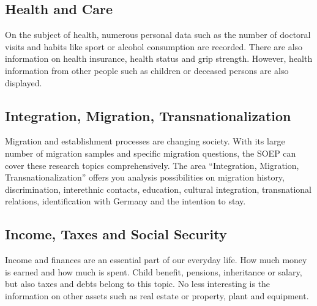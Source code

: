 \documentclass[letterpaper,10pt,openany,onesideH,english]{sphinxmanual}
\begin{document}
\begin{figure}[H]
\centering
{}\end{figure}


\subsection{Health and Care}
\label{\detokenize{Contents of SOEPcore/index:health-and-care}}
On the subject of health, numerous personal data such as the number of doctoral visits and habits like sport or alcohol consumption are recorded. There are also information on health insurance, health status and grip strength. However, health information from other people such as children or deceased persons are also displayed.

\begin{figure}[H]
\centering
{}\end{figure}


\subsection{Integration, Migration, Transnationalization}
\label{\detokenize{Contents of SOEPcore/index:integration-migration-transnationalization}}
Migration and establishment processes are changing society. With its large number of migration samples and specific migration questions, the SOEP can cover these research topics comprehensively. The area “Integration, Migration, Transnationalization” offers you analysis possibilities on migration history, discrimination, interethnic contacts, education, cultural integration, transnational relations, identification with Germany and the intention to stay.

\subsection{Income, Taxes and Social Security}
\label{\detokenize{Contents of SOEPcore/index:income-taxes-and-social-security}}
Income and finances are an essential part of our everyday life. How much money is earned and how much is spent. Child benefit, pensions, inheritance or salary, but also taxes and debts belong to this topic. No less interesting is the information on other assets such as real estate or property, plant and equipment.
\end{document}

